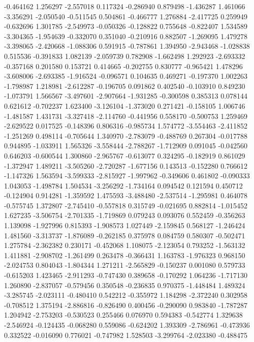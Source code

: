 -0.464162
1.256297
-2.557018
0.117324
-0.286940
0.879498
-1.436287
1.461066
-3.356291
-2.050540
-0.511545
0.504861
-0.466777
1.276884
-2.417725
0.259949
-0.632696
1.301785
-2.549973
-0.050326
-0.128822
0.755648
-0.822407
1.534589
-3.304365
-1.954639
-0.332070
0.351040
-0.210916
0.882507
-1.269095
1.479278
-3.398065
-2.420668
-1.088306
0.591915
-0.787861
1.394950
-2.943468
-1.028838
0.515536
-0.391833
1.082139
-2.059739
0.782908
-1.662498
1.292923
-2.693332
-0.357168
0.201580
0.153721
0.414665
-0.202755
0.830777
-0.965421
1.478296
-3.608006
-2.693385
-1.916524
-0.096571
0.104635
0.469271
-0.197370
1.002263
-1.798987
1.218981
-2.612287
-0.196705
0.091862
0.402540
-0.103910
0.849230
-1.073791
1.566567
-3.497601
-2.907664
-1.931285
-0.300598
0.385313
0.078144
0.621612
-0.702237
1.623400
-3.126104
-1.373020
0.271421
-0.158105
1.006746
-1.481587
1.431731
-3.327418
-2.114760
-0.441956
0.558170
-0.500753
1.259469
-2.629522
0.017525
-0.148396
0.806316
-0.985734
1.574772
-3.554463
-2.411852
-1.251269
0.498114
-0.705644
1.340970
-2.783079
-0.488769
0.267304
-0.017788
0.944895
-1.033911
1.565326
-3.558444
-2.788267
-1.712909
0.091045
-0.042560
0.646203
-0.600544
1.300860
-2.965767
-0.613077
0.324295
-0.182919
0.861029
-1.372947
1.489211
-3.505260
-2.720287
-1.677156
0.143513
-0.152280
0.766612
-1.147326
1.563594
-3.599333
-2.815927
-1.997962
-0.349606
0.461802
-0.090333
1.043053
-1.498784
1.504534
-3.256292
-1.734164
0.094542
0.121594
0.450712
-0.124904
0.914281
-1.359592
1.475593
-3.488480
-2.537514
-1.295981
0.464078
-0.575745
1.372807
-2.745410
-0.557818
0.315749
-0.021695
0.882814
-1.015452
1.627235
-3.506754
-2.701335
-1.719869
0.079243
0.093076
0.552459
-0.356263
1.139098
-1.927996
0.815393
-1.908573
1.027449
-2.159845
0.568127
-1.246424
1.481560
-3.313737
-1.876089
-0.262185
0.375978
0.084759
0.580307
-0.502471
1.275784
-2.362382
0.230171
-0.452068
1.108075
-2.123054
0.793252
-1.563132
1.411881
-2.908702
-1.261499
0.263478
-0.366431
1.163783
-1.976323
0.968150
-2.024753
0.804043
-1.804344
1.271211
-2.565829
-0.150237
0.001080
0.579733
-0.615203
1.423465
-2.911293
-0.747430
0.389658
-0.170292
1.064236
-1.717130
1.260890
-2.837057
-0.579456
0.350548
-0.236835
0.970375
-1.448484
1.489324
-3.285745
-2.023111
-0.480410
0.542212
-0.355972
1.184298
-2.372240
0.302958
-0.708512
1.375194
-2.886816
-0.826490
0.400456
-0.290090
0.983840
-1.787287
1.204942
-2.753203
-0.530523
0.255466
0.076970
0.594383
-0.542774
1.329638
-2.546924
-0.124435
-0.068280
0.559086
-0.624202
1.393309
-2.786961
-0.473936
0.332522
-0.016090
0.776021
-0.747982
1.528503
-3.299764
-2.023380
-0.488475
